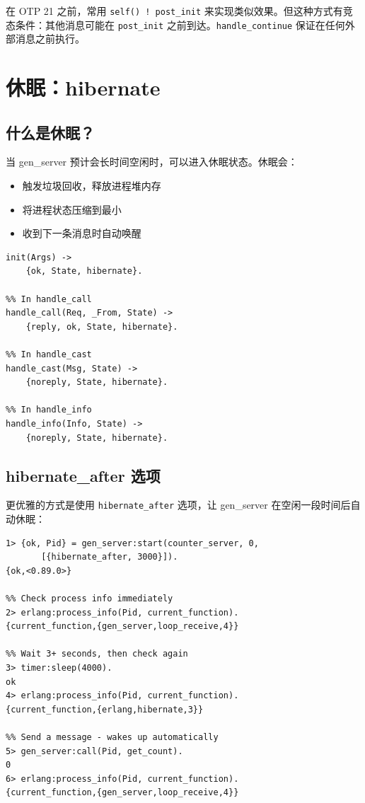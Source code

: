 \documentclass[a4paper,11pt]{article}
\begin{document}
\begin{tipbox}
在 OTP 21 之前，常用 \texttt{self() ! post\_init} 来实现类似效果。但这种方式有竞态条件：其他消息可能在 \texttt{post\_init} 之前到达。\texttt{handle\_continue} 保证在任何外部消息之前执行。
\end{tipbox}


\section{休眠：hibernate}

\subsection{什么是休眠？}

当 gen\_server 预计会长时间空闲时，可以进入休眠状态。休眠会：
\begin{itemize}[leftmargin=2em]
    \item 触发垃圾回收，释放进程堆内存
    \item 将进程状态压缩到最小
    \item 收到下一条消息时自动唤醒
\end{itemize}

\begin{lstlisting}[style=erlangstyle, caption={休眠的使用方式}]
%% In init
init(Args) ->
    {ok, State, hibernate}.

%% In handle_call
handle_call(Req, _From, State) ->
    {reply, ok, State, hibernate}.

%% In handle_cast
handle_cast(Msg, State) ->
    {noreply, State, hibernate}.

%% In handle_info
handle_info(Info, State) ->
    {noreply, State, hibernate}.
\end{lstlisting}

\subsection{hibernate\_after 选项}

更优雅的方式是使用 \texttt{hibernate\_after} 选项，让 gen\_server 在空闲一段时间后自动休眠：

\begin{lstlisting}[style=shellstyle, caption={hibernate\_after 演示}]
1> {ok, Pid} = gen_server:start(counter_server, 0,
       [{hibernate_after, 3000}]).
{ok,<0.89.0>}

%% Check process info immediately
2> erlang:process_info(Pid, current_function).
{current_function,{gen_server,loop_receive,4}}

%% Wait 3+ seconds, then check again
3> timer:sleep(4000).
ok
4> erlang:process_info(Pid, current_function).
{current_function,{erlang,hibernate,3}}

%% Send a message - wakes up automatically
5> gen_server:call(Pid, get_count).
0
6> erlang:process_info(Pid, current_function).
{current_function,{gen_server,loop_receive,4}}
\end{lstlisting}
\end{document}
